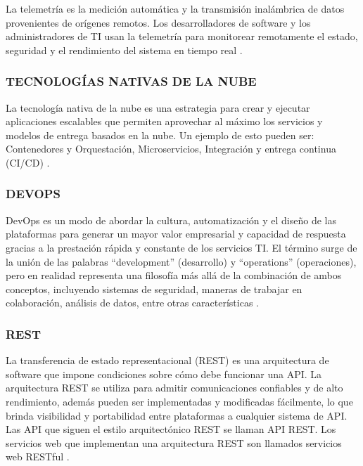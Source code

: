 \documentclass[a4paper,12pt]{article}
\begin{document}
La telemetría es la medición automática y la transmisión inalámbrica de datos provenientes de orígenes remotos. 
Los desarrolladores de software y los administradores de TI usan la telemetría para monitorear 
remotamente el estado, seguridad y el rendimiento del sistema en tiempo real \cite{telemetry}.

\subsubsection{\small TECNOLOGÍAS NATIVAS DE LA NUBE}

La tecnología nativa de la nube es una estrategia para crear y ejecutar aplicaciones escalables que 
permiten aprovechar al máximo los servicios y modelos de entrega basados en la nube. Un ejemplo de 
esto pueden ser: Contenedores y Orquestación, Microservicios, Integración y entrega continua (CI/CD) \cite{native_cloud}.

\subsubsection{\small DEVOPS}

DevOps es un modo de abordar la cultura, automatización y el diseño de las plataformas para generar 
un mayor valor empresarial y capacidad de respuesta gracias a la prestación rápida y constante de 
los servicios TI. El término surge de la unión de las palabras “development” (desarrollo) y “operations” (operaciones),
pero en realidad representa una filosofía más allá de la combinación de ambos conceptos, incluyendo 
sistemas de seguridad, maneras de trabajar en colaboración, análisis de datos, entre otras características \cite{devops}.

\subsubsection{\small REST}

La transferencia de estado representacional (REST) es una arquitectura de software que impone condiciones 
sobre cómo debe funcionar una API. La arquitectura REST se utiliza para admitir comunicaciones 
confiables y de alto rendimiento, además pueden ser implementadas y modificadas fácilmente, lo que 
brinda visibilidad y portabilidad entre plataformas a cualquier sistema de API. Las API que siguen 
el estilo arquitectónico REST se llaman API REST. Los servicios web que implementan una arquitectura 
REST son llamados servicios web RESTful \cite{APIRESTful}.
\end{document}
